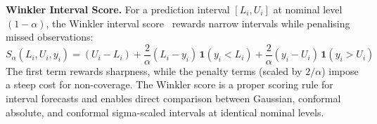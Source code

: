 \textbf{Winkler Interval Score.} For a prediction interval $[L_i, U_i]$ at nominal level $(1-\alpha)$, the Winkler interval score~\cite{winkler1972decision} rewards narrow intervals while penalising missed observations:
\begin{equation}\label{eq:winkler}
    S_\alpha(L_i, U_i, y_i) = (U_i - L_i) + \frac{2}{\alpha}(L_i - y_i)\,\mathbf{1}(y_i < L_i) + \frac{2}{\alpha}(y_i - U_i)\,\mathbf{1}(y_i > U_i)
\end{equation}
The first term rewards sharpness, while the penalty terms (scaled by $2/\alpha$) impose a steep cost for non-coverage. The Winkler score is a proper scoring rule for interval forecasts and enables direct comparison between Gaussian, conformal absolute, and conformal sigma-scaled intervals at identical nominal levels.
